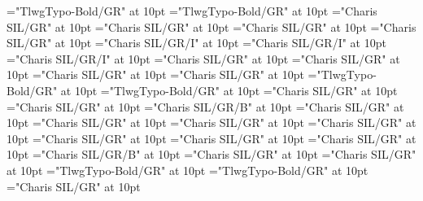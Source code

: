 \documentclass[a4paper,twoside]{article}
\begin{document}
\font\xitemptdefinitionLcptsensesensesentryletDatadicBody="TlwgTypo-Bold/GR" at 10pt
\font\spanptxitemptdefinitionLcptsensesensesentryletDatadicBody="TlwgTypo-Bold/GR" at 10pt
\font\spanendefinitionLcptsensesensesentryletDatadicBody="Charis SIL/GR" at 10pt
\font\xitemendefinitionLcptsensesensesentryletDatadicBody="Charis SIL/GR" at 10pt
\font\spanenxitemendefinitionLcptsensesensesentryletDatadicBody="Charis SIL/GR" at 10pt
\font\examplessensesensesentryletDatadicBody="Charis SIL/GR" at 10pt
\font\examplesehexamplessensesensesentryletDatadicBody="Charis SIL/GR/I" at 10pt
\font\spansehexamplesehexamplessensesensesentryletDatadicBody="Charis SIL/GR/I" at 10pt
\font\spanenexamplesehexamplessensesensesentryletDatadicBody="Charis SIL/GR/I" at 10pt
\font\spanenexamplessensesensesentryletDatadicBody="Charis SIL/GR" at 10pt
\font\variantrefsentryletDatadicBody="Charis SIL/GR" at 10pt
\font\spanenvariantrefsentryletDatadicBody="Charis SIL/GR" at 10pt
\font\variantrefentrytypevariantrefsentryletDatadicBody="Charis SIL/GR" at 10pt
\font\LexEntryTypepublishStemVariantTypeReverseAbbrPubptvariantrefentrytypevariantrefsentryletDatadicBody="TlwgTypo-Bold/GR" at 10pt
\font\spanptLexEntryTypepublishStemVariantTypeReverseAbbrPubptvariantrefentrytypevariantrefsentryletDatadicBody="TlwgTypo-Bold/GR" at 10pt
\font\spanenLexEntryTypepublishStemVariantTypeReverseAbbrPubptvariantrefentrytypevariantrefsentryletDatadicBody="Charis SIL/GR" at 10pt
\font\spanenvariantrefentrytypevariantrefsentryletDatadicBody="Charis SIL/GR" at 10pt
\font\variantrefformsehvariantrefsentryletDatadicBody="Charis SIL/GR/B" at 10pt
\font\pictureRightentryletDatadicBody="Charis SIL/GR" at 10pt
\font\picturepictureRightentryletDatadicBody="Charis SIL/GR" at 10pt
\font\pictureCaptionpictureRightentryletDatadicBody="Charis SIL/GR" at 10pt
\font\pictureSensepictureCaptionpictureRightentryletDatadicBody="Charis SIL/GR" at 10pt
\font\spanenpictureSensepictureCaptionpictureRightentryletDatadicBody="Charis SIL/GR" at 10pt
\font\pictureLabelsehpictureCaptionpictureRightentryletDatadicBody="Charis SIL/GR" at 10pt
\font\spansehpictureLabelsehpictureCaptionpictureRightentryletDatadicBody="Charis SIL/GR" at 10pt
\font\boldxsensenumbersensesensesentryletDatadicBody="Charis SIL/GR/B" at 10pt
\font\spanensensesentryletDatadicBody="Charis SIL/GR" at 10pt
\font\etymologyentryletDatadicBody="Charis SIL/GR" at 10pt
\font\etymologyformptetymologyentryletDatadicBody="TlwgTypo-Bold/GR" at 10pt
\font\spanptetymologyformptetymologyentryletDatadicBody="TlwgTypo-Bold/GR" at 10pt
\font\spanenetymologyformptetymologyentryletDatadicBody="Charis SIL/GR" at 10pt
\end{document}
